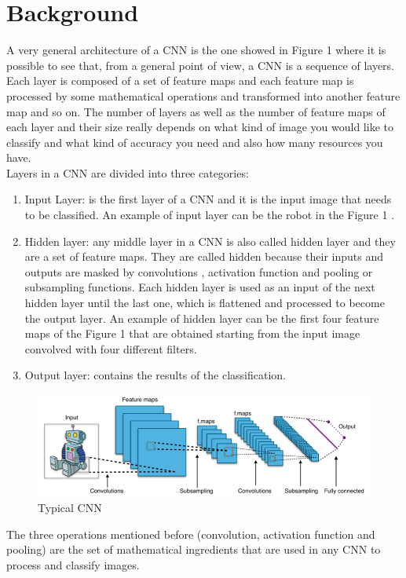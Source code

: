 \documentclass[a4paper]{report}
\begin{document}
\section{Background}
A very general architecture of a CNN is the one showed in Figure 1 where it is possible to see that, from a general point of view, a CNN is a sequence of layers.
Each layer is composed of a set of feature maps and each feature map is processed by some mathematical operations and transformed into another feature map and so on.
The number of layers as well as the number of feature maps of each layer and their size really depends on what kind of image you would like to classify and what kind of accuracy you need and also how many resources you have.\\
Layers in a CNN are divided into three categories:
\begin{enumerate}
\item Input Layer: is the first layer of a CNN and it is the input image that needs to be classified.
 An example of input layer can be the robot in the Figure 1 .
\item Hidden layer: any middle layer in a CNN is also called hidden layer and they are a set of feature maps.
They are called hidden because their inputs and outputs are masked by convolutions , activation function and pooling or subsampling functions.
Each hidden layer is used as an input of the next hidden layer until the last one, which is flattened and processed to become the output layer.
An example of hidden layer can be the first four feature maps of the Figure 1 that are obtained starting from the input image convolved with four different filters.
\item Output layer: contains the results of the classification.
\end{enumerate}

\begin{figure}[h]
\centering
\includegraphics[width=0.8\columnwidth]{docs/Typical_cnn.png} 
\caption{Typical CNN}
\label{fig_typicalCNN}
\end{figure}

The three operations mentioned before (convolution, activation function and pooling) are the set of mathematical ingredients that are used in any CNN to process and classify images.
\end{document}
